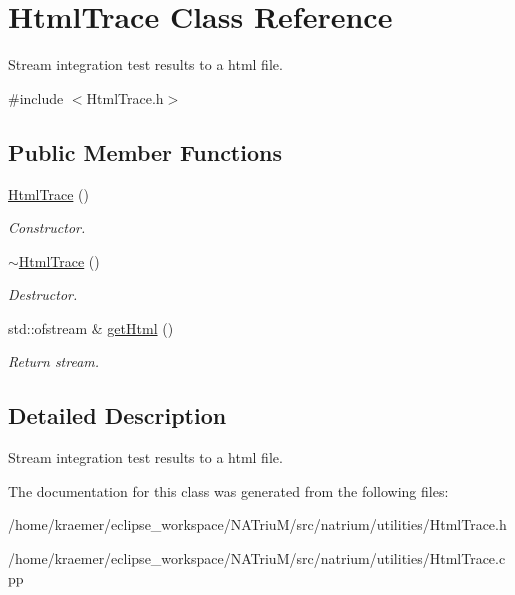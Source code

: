 \hypertarget{classHtmlTrace}{\section{Html\-Trace Class Reference}
\label{classHtmlTrace}
}


Stream integration test results to a html file.  




{\ttfamily \#include $<$Html\-Trace.\-h$>$}

\subsection*{Public Member Functions}
\begin{DoxyCompactItemize}
\item 
\hypertarget{classHtmlTrace_aad24986d7bce81d050ea6f5ec4773be7}{\hyperlink{classHtmlTrace_aad24986d7bce81d050ea6f5ec4773be7}{Html\-Trace} ()}\label{classHtmlTrace_aad24986d7bce81d050ea6f5ec4773be7}

\begin{DoxyCompactList}\small\item\em Constructor. \end{DoxyCompactList}\item 
\hypertarget{classHtmlTrace_a27003513f2782cbd57bf387a1fca8be5}{\hyperlink{classHtmlTrace_a27003513f2782cbd57bf387a1fca8be5}{$\sim$\-Html\-Trace} ()}\label{classHtmlTrace_a27003513f2782cbd57bf387a1fca8be5}

\begin{DoxyCompactList}\small\item\em Destructor. \end{DoxyCompactList}\item 
\hypertarget{classHtmlTrace_a334a99ca80288f4b25ee6e5d02edf679}{std\-::ofstream \& \hyperlink{classHtmlTrace_a334a99ca80288f4b25ee6e5d02edf679}{get\-Html} ()}\label{classHtmlTrace_a334a99ca80288f4b25ee6e5d02edf679}

\begin{DoxyCompactList}\small\item\em Return stream. \end{DoxyCompactList}\end{DoxyCompactItemize}


\subsection{Detailed Description}
Stream integration test results to a html file. 

The documentation for this class was generated from the following files\-:\begin{DoxyCompactItemize}
\item 
/home/kraemer/eclipse\-\_\-workspace/\-N\-A\-Triu\-M/src/natrium/utilities/Html\-Trace.\-h\item 
/home/kraemer/eclipse\-\_\-workspace/\-N\-A\-Triu\-M/src/natrium/utilities/Html\-Trace.\-cpp\end{DoxyCompactItemize}
